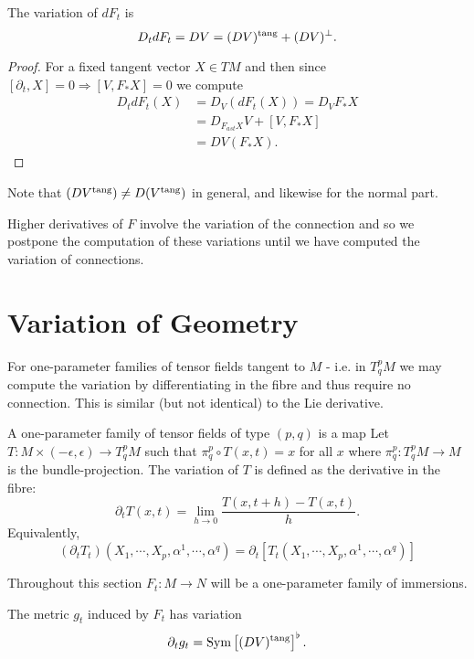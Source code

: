 \begin{prop}
The variation of \(dF_t\) is
\[
D_t dF_t = DV = (DV)^{\operatorname{tang}} + (DV)^{\perp}.
\]
\end{prop}

\begin{proof}
For a fixed tangent vector \(X \in TM\) and then since \([\partial_t, X] = 0 \Rightarrow [V, F_{\ast} X] = 0\) we compute
\[
\begin{split}
D_t dF_t (X) &= D_V (dF_t (X)) = D_V F_{\ast} X \\
&= D_{F_{ast} X} V + [V, F_{\ast} X] \\
&= DV (F_{\ast} X).
\end{split}
\]
\end{proof}

\begin{rem}
Note that \((DV^{\operatorname{tang}}) \ne D(V^{\operatorname{tang}})\) in general, and likewise for the normal part.
\end{rem}

Higher derivatives of \(F\) involve the variation of the connection and so we postpone the computation of these variations until we have computed the variation of connections.

\section{Variation of Geometry}

For one-parameter families of tensor fields tangent to \(M\) - i.e. in \(T^p_q M\) we may compute the variation by differentiating in the fibre and thus require no connection. This is similar (but not identical) to the Lie derivative.

\begin{defn}
A one-parameter family of tensor fields of type \((p, q)\) is a map
Let \(T : M \times (-\epsilon, \epsilon) \to T^p_q M\) such that \(\pi^p_q \circ T(x, t) = x\) for all \(x\) where \(\pi^p_q : T^p_q M \to M\) is the bundle-projection. The variation of \(T\) is defined as the derivative in the fibre:
\[
\partial_t T (x, t) = \lim_{h\to 0} \frac{T(x, t + h) - T(x, t)}{h}.
\]
Equivalently,
\[
(\partial_t T_t) (X_1, \cdots, X_p, \alpha^1, \cdots, \alpha^q) = \partial_t \left[T_t (X_1, \cdots, X_p, \alpha^1, \cdots, \alpha^q)\right]
\]
\end{defn}

Throughout this section \(F_t : M \to N\) will be a one-parameter family of immersions.

\begin{lemma}
The metric \(g_t\) induced by \(F_t\) has variation
\[
\partial_t g_t = \operatorname{Sym} \left[(DV)^{\operatorname{tang}}\right]^{\flat}.
\]
\end{lemma}

